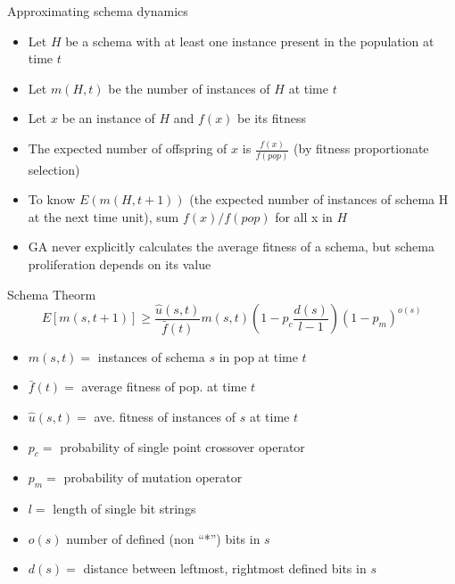 \documentclass[%
pdf,
colorBG,
slideColor,
tcrico,
]{prosper}
\begin{document}

\begin{slide}{ Approximating schema dynamics}  
\tiny
\begin{itemize}
 \item Let $H$ be a schema with at least one instance present in the population at time $t$
\item Let $m(H, t)$ be the number of instances of $H$ at time $t$
\item Let $x$ be an instance of $H$ and $f(x)$ be its fitness
\item The expected number of offspring of $x$ is $\frac{f(x)}{f(pop)}$ (by fitness proportionate selection)
\item To know  $E(m(H, t +1))$ (the expected number of instances of schema H at the next time unit), sum $f(x)/f(pop)$ for all x in $H$
\item GA never explicitly calculates the average fitness of a schema, but schema proliferation depends on its value
\end{itemize}

\end{slide}



\begin{slide}{ Schema Theorm }  
\tiny
\[E[m(s,t+1)] \geq \frac{\hat{u}(s,t)}{\bar{f}(t)}m(s,t) \left(1 -
p_{c}\frac{d(s)}{l-1}\right) (1 - p_{m})^{o(s)} \]

\begin{itemize}
\item $m(s,t) =$ instances of schema $s$ in pop at time $t$
\item $\bar{f}(t) =$ average fitness of pop. at time $t$
\item $\hat{u}(s,t) =$ ave. fitness of instances of $s$ at time $t$
\item $p_c =$ probability of single point crossover operator
\item $p_m = $ probability of mutation operator
\item $l = $ length of single bit strings
\item $o(s)$ number of defined (non ``*'') bits in $s$
\item $d(s) = $ distance between leftmost, rightmost defined bits in $s$
\end{itemize}
\end{slide}
\end{document}
